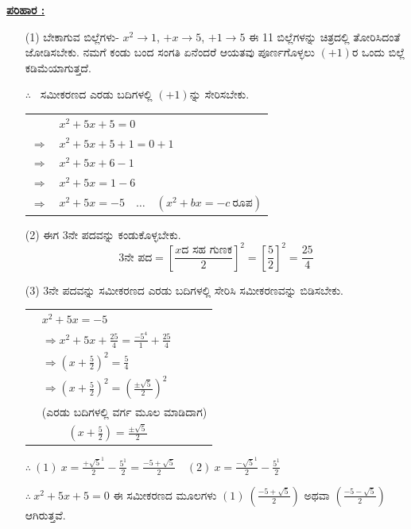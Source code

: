 \noindent
{\textbf{\underline{ಪರಿಹಾರ :}}}
\begin{itemize}
\item [(1)] ಬೇಕಾಗುವ ಬಿಲ್ಲೆಗಳು- $x^2 \rightarrow 1$, $+x \rightarrow 5$, $+1 \rightarrow 5$ ಈ 11 ಬಿಲ್ಲೆಗಳನ್ನು ಚಿತ್ರದಲ್ಲಿ ತೋರಿಸಿದಂತೆ ಜೋಡಿಸಬೇಕು. ನಮಗೆ ಕಂಡು ಬಂದ ಸಂಗತಿ ಏನೆಂದರೆ ಆಯತವು ಪೂರ್ಣಗೊಳ್ಳಲು $(+1)$ರ ಒಂದು ಬಿಲ್ಲೆ ಕಡಿಮೆಯಾಗುತ್ತದೆ. 

$\therefore$~ ಸಮೀಕರಣದ ಎರಡು ಬದಿಗಳಲ್ಲಿ $(+1)$ನ್ನು ಸೇರಿಸಬೇಕು.

\begin{tabular}{ll}
& $x^2 + 5x + 5 = 0$\\
$\Rightarrow$ & $x^2 + 5x + 5 + 1 = 0 + 1$\\
$\Rightarrow$ & $x^2 + 5x + 6 - 1$\\
$\Rightarrow$ & $x^2 + 5x = 1 - 6$\\
$\Rightarrow$ & $x^2 + 5x = -5 \quad\hdots\quad (x^2 + bx = -c ~\text{ರೂಪ})$\\
\end{tabular}

\item [(2)] ಈಗ 3ನೇ ಪದವನ್ನು ಕಂಡುಕೊಳ್ಳಬೇಕು.
$$
3\text{ನೇ ಪದ} = \left[\frac{x \text{ದ ಸಹ ಗುಣಕ}}{2} \right]^2 = \left[\frac{5}{2} \right]^2 = \frac{25}{4}
$$
\item [(3)] 3ನೇ ಪದವನ್ನು ಸಮೀಕರಣದ ಎರಡು ಬದಿಗಳಲ್ಲಿ ಸೇರಿಸಿ ಸಮೀಕರಣವನ್ನು ಬಿಡಿಸಬೇಕು. 

\begin{tabular}{ll}
& $x^2 + 5x = -5$\\
& $\Rightarrow x^2 + 5x + \frac{25}{4} = \frac{-5^4}{1} + \frac{25}{4}$\\
& $\Rightarrow \left(x + \frac{5}{2} \right)^2 = \frac{5}{4}$\\
& $\Rightarrow \left(x + \frac{5}{2}\right)^2 = \left(\frac{\pm \surd5}{2} \right)^2$\\
& \qquad \qquad  (ಎರಡು ಬದಿಗಳಲ್ಲಿ ವರ್ಗ ಮೂಲ ಮಾಡಿದಾಗ)\\
& ~~~~ $\left(x + \frac{5}{2} \right) = \frac{\pm \surd 5}{2}$\\
\end{tabular}

\smallskip 
$\therefore~ (1)~ x = \frac{+ \surd 5^1}{2} - \frac{5^1}{2} = \frac{-5 + \surd 5}{2} \quad (2)~ x = \frac{- \surd 5^1}{2} - \frac{5^1}{2}$

$\therefore~ x^2 + 5x + 5 = 0$ ಈ ಸಮೀಕರಣದ ಮೂಲಗಳು $(1)~ \left(\frac{-5 + \surd 5}{2} \right)$ ಅಥವಾ $(\frac{-5 - \surd 5}{2})$ ಆಗಿರುತ್ತವೆ.
\end{itemize}

